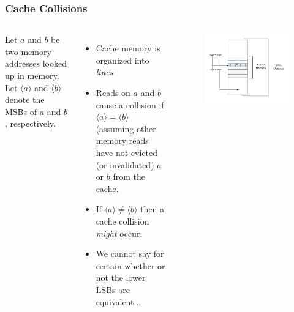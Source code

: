\documentclass[9pt,handout]{beamer}
\begin{document}
\begin{frame}
	\frametitle{Cache Collisions}

\begin{columns}
	Let $a$ and $b$ be two memory addresses looked up in memory. Let $\langle a \rangle$ and $\langle b \rangle$ 
	denote the MSBs of $a$ and $b$, respectively. 
	\begin{itemize}
		\item Cache memory is organized into \emph{lines}
		\item Reads on $a$ and $b$ cause a collision if $\langle a \rangle = \langle b \rangle$ (assuming other memory reads
		have not evicted (or invalidated) $a$ or $b$ from the cache. 
		\item If $\langle a \rangle \not= \langle b \rangle$ then a cache collision \emph{might} occur.
		\item We cannot say for certain whether or not the lower LSBs are equivalent...
	\end{itemize}
	\begin{minipage}[c][.6\textheight][c]{\linewidth}
		\begin{figure}[h!]
			\centering
			\includegraphics[scale=0.38]{images/cache_hit_miss.pdf} 
		\end{figure}
	\end{minipage}
\end{columns}
\end{frame}
\end{document}
